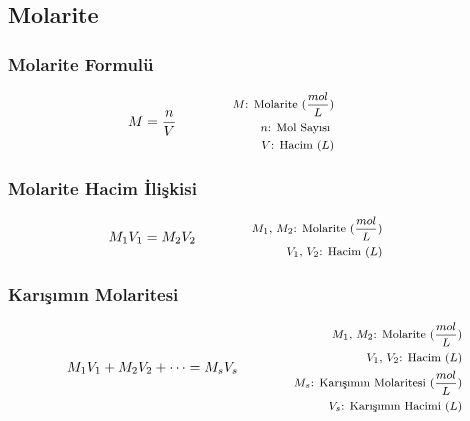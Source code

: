 \subsection{Molarite}

\subsubsection*{Molarite Formulü}
\begin{equation}
    M = \frac{n}{V} \qquad \qquad \parbox{4cm}{\footnotesize$\begin{aligned}
        M\text{: Molarite (} \frac{mol}{L} \text{)} \\
        n\text{: Mol Sayısı }\\
        V\text{: Hacim } (L) \\
\end{aligned}$}
\end{equation}

\subsubsection*{Molarite Hacim İlişkisi}
\begin{equation}
    M_1 V_1 = M_2 V_2 \qquad \qquad \parbox{4cm}{\footnotesize$\begin{aligned}
        M_1\text{, }M_2\text{: Molarite (} \frac{mol}{L} \text{)} \\
        V_1\text{, }V_2\text{: Hacim } (L) \\
\end{aligned}$}
\end{equation}

\subsubsection*{Karışımın Molaritesi}
\begin{equation}
    M_1 V_1 + M_2 V_2 + \cdots = M_s V_s \qquad \qquad \parbox{4cm}{\footnotesize$\begin{aligned}
        M_1\text{, }M_2\text{: Molarite (} \frac{mol}{L} \text{)} \\
        V_1\text{, }V_2\text{: Hacim } (L) \\
        M_s\text{: Karışımın Molaritesi (} \frac{mol}{L} \text{)} \\
        V_s\text{: Karışımın Hacimi } (L)
\end{aligned}$}
\end{equation}